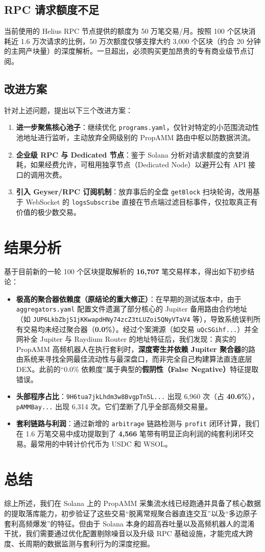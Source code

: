 \documentclass[a4paper,12pt]{article}
\begin{document}
\subsection{RPC 请求额度不足}
当前使用的 Helius RPC 节点提供的额度为 50 万笔交易/月。按照 100 个区块消耗近 1.6 万次请求的比例，50 万次额度仅够支撑大约 3,000 个区块（约合 20 分钟的主网产块量）的深度解析。一旦超出，必须购买更加昂贵的专有商业级节点订阅。

\subsection{改进方案}
针对上述问题，提出以下三个改进方案：
\begin{enumerate}
    \item \textbf{进一步聚焦核心池子}：继续优化 \texttt{programs.yaml}，仅针对特定的小范围流动性池地址进行监听，主动放弃全网级别的 PropAMM 路由中枢以防数据洪流。
    \item \textbf{企业级 RPC 与 Dedicated 节点}：鉴于 Solana 分析对请求额度的贪婪消耗，如果经费允许，可租用独享节点（Dedicated Node）以避开公有 API 接口的调用次费。
    \item \textbf{引入 Geyser/RPC 订阅机制}：放弃事后的全盘 \texttt{getBlock} 扫块轮询，改用基于 WebSocket 的 \texttt{logsSubscribe} 直接在节点端过滤目标事件，仅拉取真正有价值的极少数交易。
\end{enumerate}

\section{结果分析}
基于目前新的一轮 100 个区块提取解析的 \textbf{16,707} 笔交易样本，得出如下初步结论：
\begin{itemize}
    \item \textbf{极高的聚合器依赖度（原结论的重大修正）}：在早期的测试版本中，由于 \texttt{aggregators.yaml} 配置文件遗漏了部分核心的 Jupiter 备用路由合约地址（如 \texttt{JUP6LkbZbjS1jKKwapdHNy74zcZ3tLUZoi5QNyVTaV4} 等），导致系统误判所有交易均未经过聚合器（\textbf{0.0\%}）。经过个案溯源（如交易 \texttt{uQcSGihf...}）并全网补全 Jupiter 与 Raydium Router 的地址特征后，我们发现：真实的 PropAMM 高频机器人在执行套利时，\textbf{深度寄生并依赖 Jupiter 聚合器}的路由系统来寻找全网最佳流动性与最深盘口，而非完全自己构建算法直连底层 DEX。此前的“0.0\% 依赖度”属于典型的\textbf{假阴性（False Negative）}特征提取错误。
    \item \textbf{头部程序占比}：\texttt{9H6tua7jkLhdm3w8BvgpTn5L...} 出现 6,960 次（占 \textbf{40.6\%}），\texttt{pAMMBay...} 出现 6,314 次。它们垄断了几乎全部高频交易量。
    \item \textbf{套利链路与利润}：通过新增的 \texttt{arbitrage} 链路检测与 \texttt{profit} 闭环计算，我们在 1.6 万笔交易中成功提取到了 \textbf{4,566} 笔带有明显正向利润的纯套利闭环交易。最常用的中转计价代币为 USDC 和 WSOL。
\end{itemize}

\section{总结}
综上所述，我们在 Solana 上的 PropAMM 采集流水线已经跑通并具备了核心数据的提取落库能力，初步验证了这些交易“脱离常规聚合器直连交互”以及“多边原子套利高频爆发”的特征。但由于 Solana 本身的超高吞吐量以及高频机器人的混淆干扰，我们需要通过优化配置剔除噪音以及升级 RPC 基础设施，才能完成大跨度、长周期的数据监测与套利行为的深度挖掘。
\end{document}
